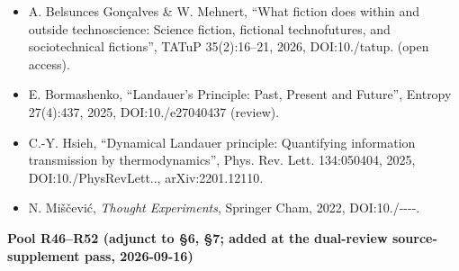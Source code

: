 \documentclass[11pt,a4paper]{article}
\begin{document}
\begin{itemize}[leftmargin=1.6em,itemsep=2pt,parsep=0pt,topsep=3pt]
\item[R42.] A. Belsunces Gonçalves \& W. Mehnert, ``What fiction does within and outside technoscience: Science fiction, fictional technofutures, and sociotechnical fictions'', TATuP 35(2):16–21, 2026, DOI:10./\allowbreak tatup. (open access).
\item[R43.] E. Bormashenko, ``Landauer's Principle: Past, Present and Future'', Entropy 27(4):437, 2025, DOI:10./\allowbreak e27040437 (review).
\item[R44.] C.-Y. Hsieh, ``Dynamical Landauer principle: Quantifying information transmission by thermodynamics'', Phys. Rev. Lett. 134:050404, 2025, DOI:10./\allowbreak PhysRevLett.., arXiv:2201.12110.
\item[R45.] N. Miščević, \textit{Thought Experiments}, Springer Cham, 2022, DOI:10./----.
\end{itemize}

\medskip
\noindent\textbf{Pool R46–R52 (adjunct to §6, §7; added at the dual-review source-supplement pass, 2026-09-16)}\par\addvspace{2pt}
\end{document}
